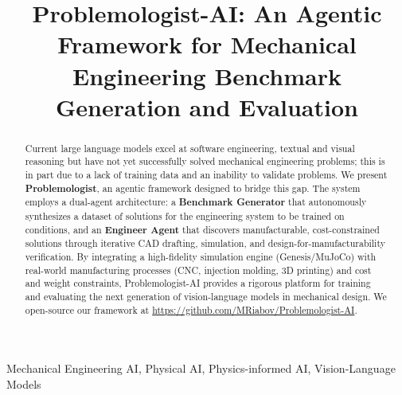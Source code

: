 \documentclass[conference]{IEEEtran}
\begin{document}
\title{Problemologist-AI: An Agentic Framework for Mechanical Engineering Benchmark Generation and Evaluation}

\author{
}

\maketitle

\begin{abstract}
Current large language models excel at software engineering, textual and visual reasoning but have not yet successfully solved mechanical engineering problems; this is in part due to a lack of training data and an inability to validate problems. We present \textbf{Problemologist}, an agentic framework designed to bridge this gap. The system employs a dual-agent architecture: a \textbf{Benchmark Generator} that autonomously synthesizes a dataset of solutions for the engineering system to be trained on conditions, and an \textbf{Engineer Agent} that discovers manufacturable, cost-constrained solutions through iterative CAD drafting, simulation, and design-for-manufacturability verification. By integrating a high-fidelity simulation engine (Genesis/MuJoCo) with real-world manufacturing processes (CNC, injection molding, 3D printing) and cost and weight constraints, Problemologist-AI provides a rigorous platform for training and evaluating the next generation of vision-language models in mechanical design. We open-source our framework at \url{https://github.com/MRiabov/Problemologist-AI}.
\end{abstract}

\begin{IEEEkeywords}
Mechanical Engineering AI, Physical AI, Physics-informed AI, Vision-Language Models
\end{IEEEkeywords}
\end{document}
